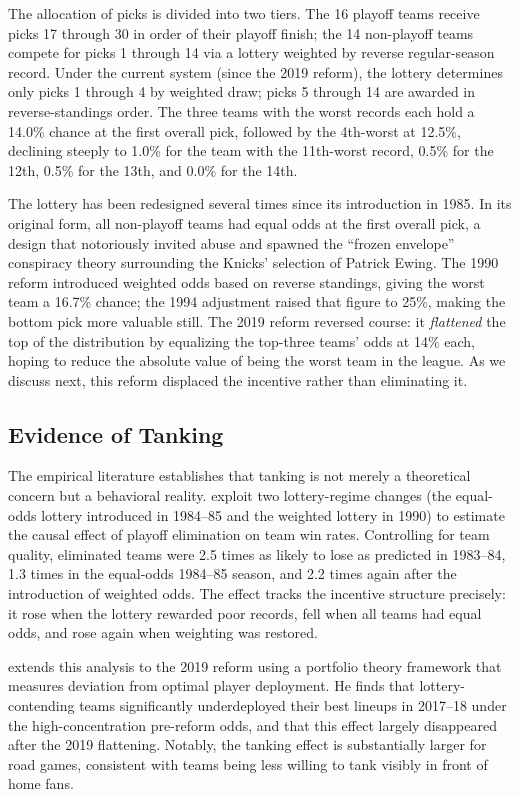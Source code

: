 \documentclass{article}
\begin{document}
The allocation of picks is divided into two tiers.
The 16 playoff teams receive picks 17 through 30 in order of their playoff
finish; the 14 non-playoff teams compete for picks 1 through 14 via a lottery
weighted by reverse regular-season record.
Under the current system (since the 2019 reform), the lottery determines only
picks 1 through 4 by weighted draw; picks 5 through 14 are awarded in
reverse-standings order.
The three teams with the worst records each hold a 14.0\% chance at the
first overall pick, followed by the 4th-worst at 12.5\%, declining steeply
to 1.0\% for the team with the 11th-worst record, 0.5\% for the 12th, 0.5\%
for the 13th, and 0.0\% for the 14th.

The lottery has been redesigned several times since its introduction in 1985.
In its original form, all non-playoff teams had equal odds at the first
overall pick, a design that notoriously invited abuse and spawned the
``frozen envelope'' conspiracy theory surrounding the Knicks' selection of
Patrick Ewing.
The 1990 reform introduced weighted odds based on reverse standings, giving
the worst team a 16.7\% chance; the 1994 adjustment raised that figure to
25\%, making the bottom pick more valuable still.
The 2019 reform reversed course: it \emph{flattened} the top of the
distribution by equalizing the top-three teams' odds at 14\% each, hoping
to reduce the absolute value of being the worst team in the league.
As we discuss next, this reform displaced the incentive rather than
eliminating it.

\subsection{Evidence of Tanking}

The empirical literature establishes that tanking is not merely a theoretical
concern but a behavioral reality.
\citet{taylor2002} exploit two lottery-regime changes (the equal-odds lottery
introduced in 1984--85 and the weighted lottery in 1990) to estimate the
causal effect of playoff elimination on team win rates.
Controlling for team quality, eliminated teams were 2.5 times as likely to
lose as predicted in 1983--84, 1.3 times in the equal-odds 1984--85 season,
and 2.2 times again after the introduction of weighted odds.
The effect tracks the incentive structure precisely: it rose when the lottery
rewarded poor records, fell when all teams had equal odds, and rose again when
weighting was restored.

\citet{schmidt2024} extends this analysis to the 2019 reform using a portfolio
theory framework that measures deviation from optimal player deployment.
He finds that lottery-contending teams significantly underdeployed their best
lineups in 2017--18 under the high-concentration pre-reform odds, and that
this effect largely disappeared after the 2019 flattening.
Notably, the tanking effect is substantially larger for road games, consistent
with teams being less willing to tank visibly in front of home fans.
\end{document}
